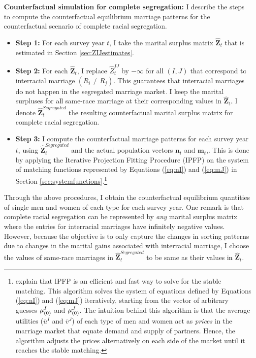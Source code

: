 \textbf{Counterfactual simulation for complete segregation:} I describe the steps to compute the counterfactual equilibrium marriage patterns for the counterfactual scenario of complete racial segregation. 
\begin{itemize}
	\item \textbf{Step 1:} For each survey year $t$, I take the marital surplus matrix $\hat{\mathbf{Z}}_t$ that is estimated in Section \ref{sec:ZIJestimates}.
	
	\item \textbf{Step 2:} For each $\hat{\mathbf{Z}}_t$, I replace $\hat{Z}^{IJ}_t$ by $-\infty$ for all $(I,J)$ that correspond to interracial marriage $(R_i \neq R_j)$. This guarantees that interracial marriages do not happen in the segregated marriage market. I keep the marital surpluses for all same-race marriage at their corresponding values in $\hat{\mathbf{Z}}_t$. I denote $\hat{\mathbf{Z}}^{Segregated}_t$ the resulting counterfactual marital surplus matrix for complete racial segregation. 

	\item \textbf{Step 3:} I compute the counterfactual marriage patterns for each survey year $t$, using $\hat{\mathbf{Z}}^{Segregated}_t$ and the actual population vectors $\mathbf{n}_t$ and $\mathbf{m}_t$,. This is done by applying the Iterative Projection Fitting Procedure (IPFP) on the system of matching functions represented by Equations (\ref{eq:nI}) and (\ref{eq:mJ}) in Section \ref{sec:systemfunctions}.\footnote{\cite{GalichonSalanie_2022_CupidInvisibleHand} explain that IPFP is an efficient and fast way to solve for the stable matching. This algorithm solves the system of equations defined by Equations (\ref{eq:nI}) and (\ref{eq:mJ}) iteratively, starting from the vector of arbitrary guesses $\mu^{I\empty}_{(0)}$ and $\mu^{\empty J}_{(0)}$. The intuition behind this algorithm is that the average utilities ($\bar{u}^I$ and $\bar{v}^J$) of each type of men and women act as \textit{prices} in the marriage market that equate demand and supply of partners. Hence, the algorithm adjusts the prices alternatively on each side of the market until it reaches the stable matching.}
\end{itemize}

 Through the above procedures, I obtain the counterfactual equilibrium quantities of single men and women of each type for each survey year. One remark is that complete racial segregation can be represented by \textit{any} marital surplus matrix where the entries for interracial marriages have infinitely negative values. However, because the objective is to only capture the changes in sorting patterns due to changes in the marital gains associated with interracial marriage, I choose the values of same-race marriages in $\hat{\mathbf{Z}}^{Segregated}_t$ to be same as their values in $\hat{\mathbf{Z}}_t$. 

